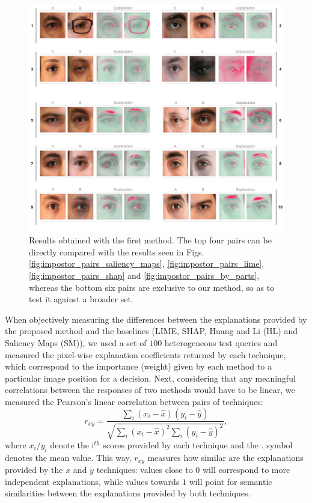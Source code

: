 \begin{figure}[H]
\centering
\includegraphics[width=\textwidth]{figures/new_figure_37.pdf}
\caption{Results obtained with the first method. The top four pairs can be directly compared with the results seen in Figs. \ref{fig:impostor_pairs_saliency_maps}, \ref{fig:impostor_pairs_lime}, \ref{fig:impostor_pairs_shap} and \ref{fig:impostor_pairs_by_parts}, whereas the bottom six pairs are exclusive to our method, so as to test it against a broader set.}
\label{fig:method_a_results}
\end{figure}

When objectively measuring the differences between the explanations provided by the proposed method and the baselines (\ac{LIME}, \ac{SHAP}, Huang and Li (HL) and  Saliency Maps (SM)), we used a set of $100$ heterogeneous test queries and measured the pixel-wise explanation coefficients returned by each technique, which correspond to the importance (weight) given by each method to a particular image position for a decision. Next, considering that any meaningful correlations between the responses of two methods would have to be linear, we measured the Pearson's linear correlation between pairs of techniques:
\begin{equation}
    r_{xy} = \frac{\sum_i (x_i - \hat{x}) (y_i -\hat{y})}{\sqrt{\sum_i (x_i -\hat{x})^2 \sum_i (y_i -\hat{y})^2}},
\label{eq:neighbour_score}
\end{equation}
where $x_i/y_i$ denote the i$^{th}$ scores provided by each technique and the $\hat{.}$ symbol denotes the mean value. This way, $r_{xy}$ measures how similar are the explanations provided by the $x$ and $y$ techniques: values close to $0$ will correspond to more independent explanations, while values towards $1$ will point for semantic similarities between the explanations provided by both techniques.\\


